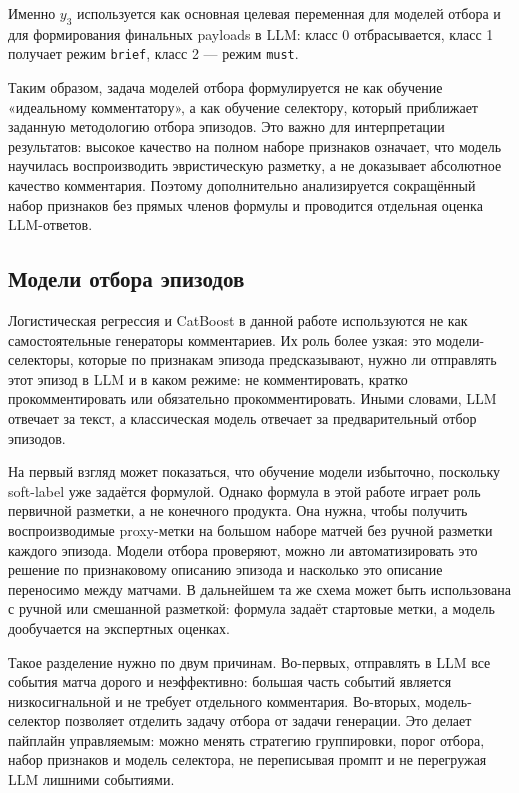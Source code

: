 \documentclass[a4paper,14pt]{extarticle}
\numberwithin{table}{section}
\numberwithin{figure}{section}
\numberwithin{equation}{section}
\begin{document}
Именно $y_3$ используется как основная целевая переменная для моделей отбора и для формирования финальных payloads в LLM: класс 0 отбрасывается, класс 1 получает режим \texttt{brief}, класс 2 --- режим \texttt{must}.

Таким образом, задача моделей отбора формулируется не как обучение «идеальному комментатору», а как обучение селектору, который приближает заданную методологию отбора эпизодов. Это важно для интерпретации результатов: высокое качество на полном наборе признаков означает, что модель научилась воспроизводить эвристическую разметку, а не доказывает абсолютное качество комментария. Поэтому дополнительно анализируется сокращённый набор признаков без прямых членов формулы и проводится отдельная оценка LLM-ответов.

\subsection{Модели отбора эпизодов}

Логистическая регрессия и CatBoost в данной работе используются не как самостоятельные генераторы комментариев. Их роль более узкая: это модели-селекторы, которые по признакам эпизода предсказывают, нужно ли отправлять этот эпизод в LLM и в каком режиме: не комментировать, кратко прокомментировать или обязательно прокомментировать. Иными словами, LLM отвечает за текст, а классическая модель отвечает за предварительный отбор эпизодов.

На первый взгляд может показаться, что обучение модели избыточно, поскольку soft-label уже задаётся формулой. Однако формула в этой работе играет роль первичной разметки, а не конечного продукта. Она нужна, чтобы получить воспроизводимые proxy-метки на большом наборе матчей без ручной разметки каждого эпизода. Модели отбора проверяют, можно ли автоматизировать это решение по признаковому описанию эпизода и насколько это описание переносимо между матчами. В дальнейшем та же схема может быть использована с ручной или смешанной разметкой: формула задаёт стартовые метки, а модель дообучается на экспертных оценках.

Такое разделение нужно по двум причинам. Во-первых, отправлять в LLM все события матча дорого и неэффективно: большая часть событий является низкосигнальной и не требует отдельного комментария. Во-вторых, модель-селектор позволяет отделить задачу отбора от задачи генерации. Это делает пайплайн управляемым: можно менять стратегию группировки, порог отбора, набор признаков и модель селектора, не переписывая промпт и не перегружая LLM лишними событиями.
\end{document}
